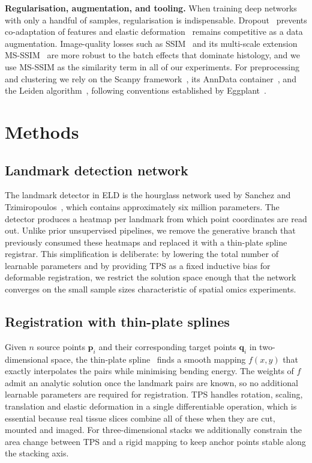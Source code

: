 \documentclass[11pt]{article}
\begin{document}
\textbf{Regularisation, augmentation, and tooling.} When training deep networks with only a handful of samples, regularisation is indispensable. Dropout~\cite{dropout2014hinton} prevents co-adaptation of features and elastic deformation~\cite{simard2003best} remains competitive as a data augmentation. Image-quality losses such as SSIM~\cite{wang2004image} and its multi-scale extension MS-SSIM~\cite{wang2003multiscale} are more robust to the batch effects that dominate histology, and we use MS-SSIM as the similarity term in all of our experiments. For preprocessing and clustering we rely on the Scanpy framework~\cite{wolf2018scanpy}, its AnnData container~\cite{virshup2024anndata}, and the Leiden algorithm~\cite{traag2019louvain}, following conventions established by Eggplant~\cite{bergenstrahle2021eggplant}.

\section{Methods}

\subsection{Landmark detection network}

The landmark detector in ELD is the hourglass network used by Sanchez and Tzimiropoulos~\cite{sanchez2019object,newell2016stacked}, which contains approximately six million parameters. The detector produces a heatmap per landmark from which point coordinates are read out. Unlike prior unsupervised pipelines, we remove the generative branch that previously consumed these heatmaps and replaced it with a thin-plate spline registrar. This simplification is deliberate: by lowering the total number of learnable parameters and by providing TPS as a fixed inductive bias for deformable registration, we restrict the solution space enough that the network converges on the small sample sizes characteristic of spatial omics experiments.

\subsection{Registration with thin-plate splines}

Given $n$ source points $\mathbf{p}_i$ and their corresponding target points $\mathbf{q}_i$ in two-dimensional space, the thin-plate spline~\cite{bookstein1989principal,keller2020thinplate} finds a smooth mapping $f(x, y)$ that exactly interpolates the pairs while minimising bending energy. The weights of $f$ admit an analytic solution once the landmark pairs are known, so no additional learnable parameters are required for registration. TPS handles rotation, scaling, translation and elastic deformation in a single differentiable operation, which is essential because real tissue slices combine all of these when they are cut, mounted and imaged. For three-dimensional stacks we additionally constrain the area change between TPS and a rigid mapping to keep anchor points stable along the stacking axis.
\end{document}
